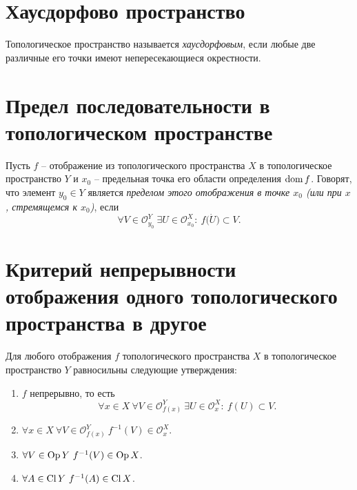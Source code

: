 \section{Хаусдорфово пространство}

\begin{definition}
	Топологическое пространство называется \emph{хаусдорфовым}, если любые две различные его точки имеют непересекающиеся окрестности.
\end{definition}

\section{Предел последовательности в топологическом пространстве}

\begin{definition}
  Пусть $f$ -- отображение из топологического пространства $X$ в топологическое пространство $Y$ и $x_0$ -- предельная точка его области определения $\operatorname{dom} f$. Говорят, что элемент $y_0 \in Y$ является \emph{пределом этого отображения в точке $x_0$ (или при $x$, стремящемся к $x_0$)}, если
  \[
    \forall V \in \mathcal{O}_{y_0}^{Y} \ \exists U \in \mathcal{O}_{x_0}^{X} : \ f \big(\dot{U}\big) \subset V.
  \]
\end{definition}

\section{Критерий непрерывности отображения одного топологического пространства в другое}

\begin{theorem}
	Для любого отображения $f$ топологического пространства $X$ в топологическое пространство $Y$ равносильны следующие утверждения:
	\begin{enumerate}
		\item $f$ непрерывно, то есть
		      \[
			      \forall x \in X \ \forall V \in \mathcal{O}_{f(x)}^{Y} \ \exists U \in \mathcal{O}_{x}^{X} : \ f(U) \subset V.
		      \]
		\item $\forall x \in X \ \forall V \in \mathcal{O}_{f(x)}^{Y} \ f^{-1} (V) \in \mathcal{O}_{x}^{X} $.
		\item $\forall V \in \operatorname{Op} Y \ f^{-1} (V) \in \operatorname{Op} X$.
		\item $\forall A \in \operatorname{Cl} Y \ f^{-1} (A)\in \operatorname{Cl} X$.
	\end{enumerate}
\end{theorem}
